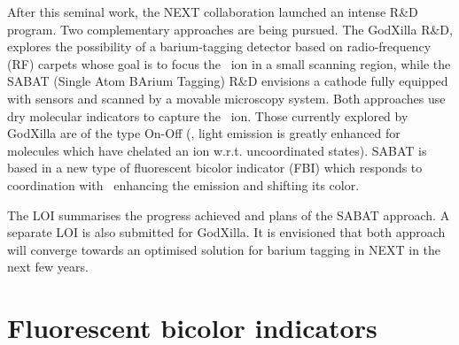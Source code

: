 \documentclass[a4paper,11pt]{article}
\begin{document}
After this seminal work, the NEXT collaboration launched an intense R\&D program. Two complementary approaches are being pursued. The GodXilla  R\&D, explores the possibility of a barium-tagging detector based on radio-frequency (RF) carpets whose goal is to focus the \Bapp\ ion in a small scanning region, while the SABAT (Single Atom BArium Tagging) R\&D envisions a cathode fully equipped with sensors and scanned by a movable microscopy system. Both approaches use dry molecular indicators to capture the \Bapp\ ion. Those currently explored by GodXilla are of the type On-Off (\eg, light emission is greatly enhanced for molecules which have chelated an ion  w.r.t. uncoordinated states). SABAT is based in a new type of fluorescent bicolor indicator (FBI) which responds to coordination with \Bapp\ enhancing the emission and shifting its color. 

The LOI summarises the progress achieved and plans of the SABAT approach. A separate LOI is also submitted for GodXilla. It is envisioned that both approach will converge towards an optimised solution for barium tagging in NEXT in the next few years.  


\section{Fluorescent bicolor indicators}
\end{document}
